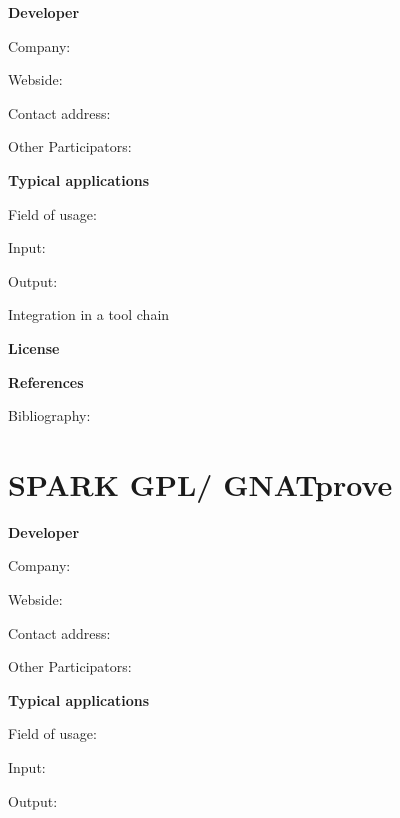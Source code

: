\documentclass{./template/openetcs2}
\begin{document}
	\textbf{Developer}

	Company: 

	Webside:

	Contact address:

	Other  Participators:



	\textbf{Typical applications}

	Field of usage:


	Input:

	Output:





	Integration in a tool chain



	\textbf{License}


	\textbf{References}

	Bibliography:


\section{SPARK GPL/ GNATprove}

	\textbf{Developer}

	Company: 

	Webside:

	Contact address:

	Other  Participators:



	\textbf{Typical applications}

	Field of usage:


	Input:

	Output:

\end{document}
